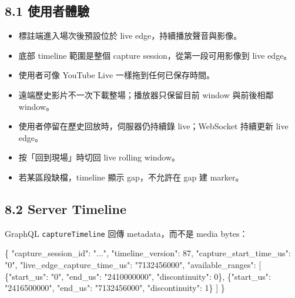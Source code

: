 \documentclass[
  9pt,
  a4paper,
]{article}
\newenvironment{Shaded}{}{}
\newcommand{\DataTypeTok}[1]{\textcolor[rgb]{0.56,0.13,0.00}{#1}}
\newcommand{\DecValTok}[1]{\textcolor[rgb]{0.25,0.63,0.44}{#1}}
\newcommand{\FunctionTok}[1]{\textcolor[rgb]{0.02,0.16,0.49}{#1}}
\newcommand{\OtherTok}[1]{\textcolor[rgb]{0.00,0.44,0.13}{#1}}
\newcommand{\StringTok}[1]{\textcolor[rgb]{0.25,0.44,0.63}{#1}}
\providecommand{\tightlist}{%
  \setlength{\itemsep}{0pt}\setlength{\parskip}{0pt}}
\begin{document}
\subsection{8.1 使用者體驗}\label{81-ux4f7fux7528ux8005ux9ad4ux9a57}

\begin{itemize}
\tightlist
\item
  標註端進入場次後預設位於 live edge，持續播放聲音與影像。
\item
  底部 timeline 範圍是整個 capture session，從第一段可用影像到 live
  edge。
\item
  使用者可像 YouTube Live 一樣拖到任何已保存時間。
\item
  遠端歷史影片不一次下載整場；播放器只保留目前 window 與前後相鄰
  window。
\item
  使用者停留在歷史回放時，伺服器仍持續錄 live；WebSocket 持續更新 live
  edge。
\item
  按「回到現場」時切回 live rolling window。
\item
  若某區段缺檔，timeline 顯示 gap，不允許在 gap 建 marker。
\end{itemize}

\subsection{8.2 Server Timeline}\label{82-server-timeline}

GraphQL \texttt{captureTimeline} 回傳 metadata，而不是 media bytes：

\begin{Shaded}
\begin{Highlighting}[]
\FunctionTok{\{}
  \DataTypeTok{"capture\_\allowbreak{}session\_\allowbreak{}id"}\FunctionTok{:} \StringTok{"..."}\FunctionTok{,}
  \DataTypeTok{"timeline\_\allowbreak{}version"}\FunctionTok{:} \DecValTok{87}\FunctionTok{,}
  \DataTypeTok{"capture\_\allowbreak{}start\_\allowbreak{}time\_\allowbreak{}us"}\FunctionTok{:} \StringTok{"0"}\FunctionTok{,}
  \DataTypeTok{"live\_\allowbreak{}edge\_\allowbreak{}capture\_\allowbreak{}time\_\allowbreak{}us"}\FunctionTok{:} \StringTok{"7132456000"}\FunctionTok{,}
  \DataTypeTok{"available\_\allowbreak{}ranges"}\FunctionTok{:} \OtherTok{[}
    \FunctionTok{\{}\DataTypeTok{"start\_\allowbreak{}us"}\FunctionTok{:} \StringTok{"0"}\FunctionTok{,} \DataTypeTok{"end\_\allowbreak{}us"}\FunctionTok{:} \StringTok{"2410000000"}\FunctionTok{,} \DataTypeTok{"discontinuity"}\FunctionTok{:} \DecValTok{0}\FunctionTok{\}}\OtherTok{,}
    \FunctionTok{\{}\DataTypeTok{"start\_\allowbreak{}us"}\FunctionTok{:} \StringTok{"2416500000"}\FunctionTok{,} \DataTypeTok{"end\_\allowbreak{}us"}\FunctionTok{:} \StringTok{"7132456000"}\FunctionTok{,} \DataTypeTok{"discontinuity"}\FunctionTok{:} \DecValTok{1}\FunctionTok{\}}
  \OtherTok{]}
\FunctionTok{\}}
\end{Highlighting}
\end{Shaded}
\end{document}
